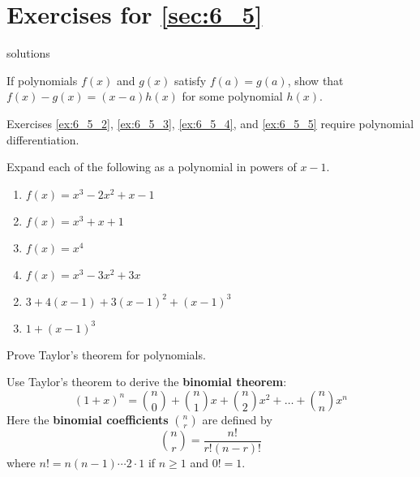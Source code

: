 \section*{Exercises for \ref{sec:6_5}}

\begin{Filesave}{solutions}
\end{Filesave}

\begin{multicols}{2}
\begin{ex}
If polynomials $f(x)$ and $g(x)$ satisfy $f(a) = g(a)$, show that $f(x) - g(x) = (x - a)h(x)$ for some polynomial $h(x)$.
\end{ex}

\medskip

\noindent
Exercises \ref{ex:6_5_2}, \ref{ex:6_5_3}, \ref{ex:6_5_4}, and \ref{ex:6_5_5} require polynomial differentiation.

\begin{ex} \label{ex:6_5_2}
Expand each of the following as a polynomial in powers of $x - 1$.

\begin{enumerate}[label={\alph*.}]
\item $f(x) = x^{3} - 2x^{2} + x - 1$

\item $f(x) = x^{3} + x + 1$

\item $f(x) = x^{4}$

\item $f(x) = x^{3} - 3x^{2} + 3x$

\end{enumerate}
\begin{sol}
\begin{enumerate}[label={\alph*.}]
\setcounter{enumi}{1}
\item  $3 + 4(x - 1) + 3(x - 1)^{2} + (x - 1)^{3}$

\setcounter{enumi}{3}
\item  $1 + (x - 1)^{3}$

\end{enumerate}
\end{sol}
\end{ex}

\begin{ex} \label{ex:6_5_3}
Prove Taylor's theorem for polynomials.
\end{ex}

\begin{ex} \label{ex:6_5_4}
Use Taylor's theorem to derive the \textbf{binomial theorem}:
\begin{equation*}
(1 + x)^n = 
\binom{n}{0}
+
\binom{n}{1}
x +
\binom{n}{2}
x^2 + \dots +
\binom{n}{n}
x^n
\end{equation*}
Here the \textbf{binomial coefficients} $\binom{n}{r}$ are defined by 
\begin{equation*}
\binom{n}{r} = \frac{n!}{r!(n - r)!}
\end{equation*}
where $n! = n(n - 1) \cdots 2 \cdot 1$ if $n \geq 1$ and $0! = 1$.
\end{ex}


\end{multicols}

